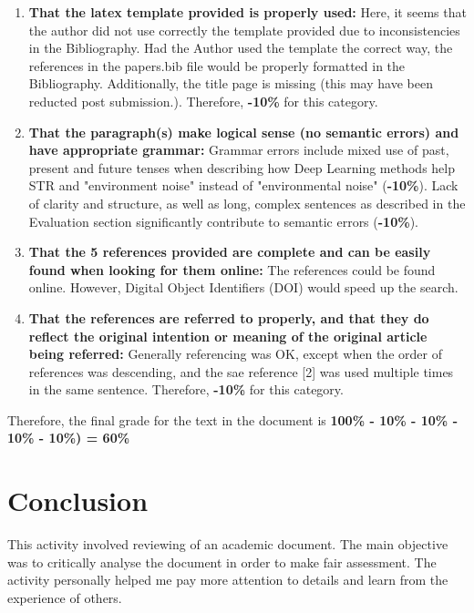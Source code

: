 \begin{enumerate}
 \item \textbf{That the latex template provided is properly used:} Here, it seems that the author did not use correctly the template provided due to inconsistencies in the Bibliography. Had the Author used the template the correct way, the references in the papers.bib file would be properly formatted in the Bibliography. Additionally, the title page is missing (this may have been reducted post submission.). Therefore, \textbf{-10\%} for this category.
 \item \textbf{That the paragraph(s) make logical sense (no semantic errors) and have appropriate grammar:} Grammar errors include mixed use of past, present and future tenses when describing how Deep Learning methods help STR and "environment noise" instead of "environmental noise" (\textbf{-10\%}). Lack of clarity and structure, as well as long, complex sentences as described in the Evaluation section significantly contribute to semantic errors (\textbf{-10\%}).
 \item \textbf{That the 5 references provided are complete and can be easily found when looking for them online:} The references could be found online. However, Digital Object Identifiers (DOI) would speed up the search.
 \item \textbf{That the references are referred to properly, and that they do reflect the original intention or meaning of the original article being referred:} Generally referencing was OK, except when the order of references was descending, and the sae reference [2] was used multiple times in the same sentence. Therefore, \textbf{-10\%} for this category.
\end{enumerate}

Therefore, the final grade for the text in the document is \textbf{100\% - 10\% - 10\% - 10\% - 10\%) = 60\%}

\section*{Conclusion}
This activity involved reviewing of an academic document. The main objective was to critically analyse the document in order to make fair assessment. The activity personally helped me pay more attention to details and learn from the experience of others. 





